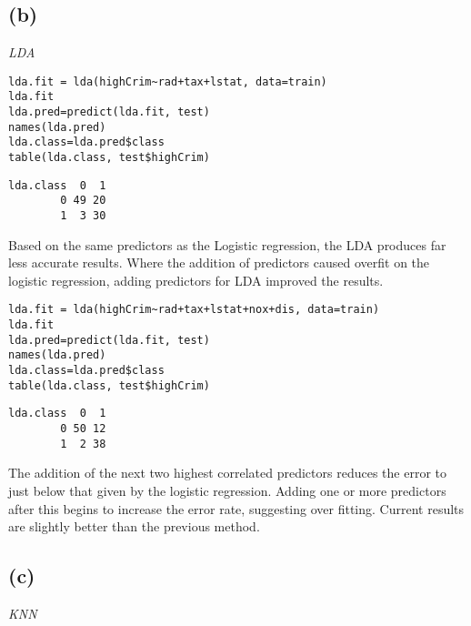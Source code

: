 \documentclass[a4paper,man,natbib]{apa6}
\begin{document}
\subsection{(b)}
\emph{LDA}
\begin{verbatim}
lda.fit = lda(highCrim~rad+tax+lstat, data=train)
lda.fit
lda.pred=predict(lda.fit, test)
names(lda.pred)
lda.class=lda.pred$class
table(lda.class, test$highCrim)
\end{verbatim}

\begin{verbatim}
lda.class  0  1
		0 49 20
		1  3 30
\end{verbatim}

Based on the same predictors as the Logistic regression, the LDA produces far less accurate results. Where the addition of predictors caused overfit on the logistic regression, adding predictors for LDA improved the results.

\begin{verbatim}
lda.fit = lda(highCrim~rad+tax+lstat+nox+dis, data=train)
lda.fit
lda.pred=predict(lda.fit, test)
names(lda.pred)
lda.class=lda.pred$class
table(lda.class, test$highCrim)
\end{verbatim}

\begin{verbatim}
lda.class  0  1
		0 50 12
		1  2 38
\end{verbatim}

The addition of the next two highest correlated predictors reduces the error to just below that given by the logistic regression. Adding one or more predictors after this begins to increase the error rate, suggesting over fitting. Current results are slightly better than the previous method.

\subsection{(c)}
\emph{KNN}
\begin{verbatim}
\end{verbatim}
	
\end{document}
